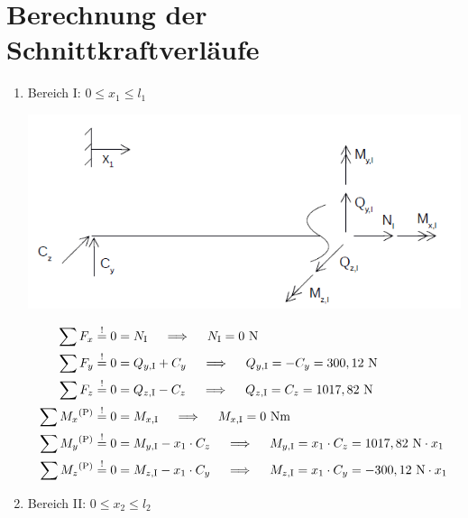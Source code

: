 \section{Berechnung der Schnittkraftverläufe}
\renewcommand{\labelenumi}{\roman{enumi})}
\begin{enumerate}
\item Bereich I: $0 \leq x_1 \leq l_1$
\begin{center}
	\includegraphics[width=1.04\textwidth,keepaspectratio]{figures/Bereich1.png}
\end{center}
    \begin{align*}
        \sum F_x &\overset{!}{=} 0 = N_{\mathrm{I}} \quad \implies \quad  N_{\mathrm{I}} = 0 \text{ N}\\ 
        \sum F_y &\overset{!}{=} 0 =  Q_{y,\mathrm{I}} + C_y \quad \implies \quad  Q_{y,\mathrm{I}} = -C_y = 300,12\text{ N}\\
        \sum F_z &\overset{!}{=} 0 =  Q_{z,\mathrm{I}} - C_z \quad \implies \quad  Q_{z,\mathrm{I}} = C_z = 1017,82\text{ N}\\
        \sum M_x \textsuperscript{(P)}&\overset{!}{=} 0 = M_{x,\mathrm{I}} \quad \implies \quad   M_{x,\mathrm{I}} = 0 \text{ Nm} \\ 
        \sum M_y \textsuperscript{(P)}&\overset{!}{=} 0 = M_{y,\mathrm{I}} - x_1 \cdot C_z \quad \implies \quad   M_{y,\mathrm{I}} =x_1 \cdot C_z =1017,82 \text{ N} \cdot x_1\\ 
        \sum M_z \textsuperscript{(P)}&\overset{!}{=} 0 = M_{z,\mathrm{I}} -x_1 \cdot C_y  \quad \implies \quad   M_{z,\mathrm{I}} = x_1 \cdot C_y = -300,12 \text{ N} \cdot x_1 \\ 
    \end{align*}
\newpage
\item Bereich II: $0 \leq x_2 \leq l_2$
\begin{center}

\end{center}
\end{enumerate}
